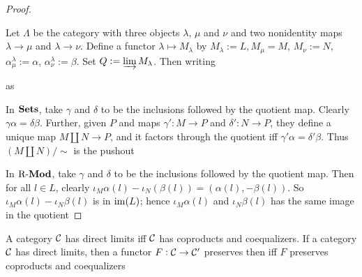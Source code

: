 \documentclass[11pt]{article}
\begin{document}
\begin{proof}
\begin{center}
\end{center}
Let \(\Lambda\) be the category with three objects \(\lambda\), \(\mu\) and \(\nu\) and two nonidentity maps
\(\lambda\to\mu\) and \(\lambda\to\nu\). Define a functor \(\lambda\mapsto
   M_\lambda\) by \(M_\lambda:=L,M_\mu=M\), \(M_\nu:=N\),
\(\alpha_\mu^\lambda:=\alpha\), \(\alpha_\nu^\lambda:=\beta\). Set \(Q:=\varinjlim
   M_\lambda\). Then writing
\begin{center}
\hspace{1cm}as\hspace{1cm}
\end{center}

In \(\operatorname{\textbf{Sets}}\), take \(\gamma\) and \(\delta\) to be the inclusions followed by the quotient map.
Clearly \(\gamma\alpha=\delta\beta\). Further, given \(P\) and maps
\(\gamma':M\to P\) and \(\delta':N\to P\), they define a unique map
\(M\coprod N\to P\), and it factors through the quotient iff
\(\gamma'\alpha=\delta'\beta\). Thus \((M\coprod N)/\sim\) is the pushout

In \(\operatorname{R-\textbf{Mod}}\), take \(\gamma\) and \(\delta\) to be the inclusions followed by the quotient map.
Then for all \(l\in L\), clearly
\(\iota_M\alpha(l)-\iota_N(\beta(l))=(\alpha(l),-\beta(l))\). So
\(\iota_M\alpha(l)-\iota_N\beta(l)\) is in \(\operatorname{im}(L)\); hence
\(\iota_M\alpha(l)\) and \(\iota_N\beta(l)\) has the same image in the quotient
\end{proof}

\begin{lemma}[]
A category \(\mathcal{C}\) has direct limits iff \(\mathcal{C}\) has coproducts and
coequalizers. If a category \(\mathcal{C}\) has direct limits, then a functor
\(F:\mathcal{C}\to\mathcal{C}'\) preserves then iff \(F\) preserves coproducts and coequalizers
\end{lemma}
\end{document}
